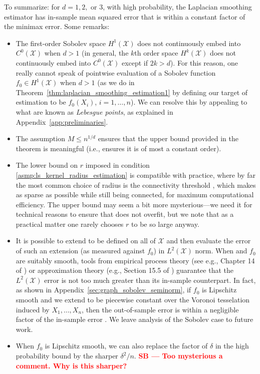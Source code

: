 \documentclass[twoside]{article}
\newcommand{\red}[1]{\textcolor{red}{#1}}
\newcommand{\sbcomment}[1]{{\bf{{\red{{SB --- #1}}}}}}
\newcommand{\1}{\mathbf{1}}
\newcommand{\Xset}{\mathcal{X}}
\newcommand{\Leb}{L}
\newcommand{\wh}[1]{\widehat{#1}}
\theoremstyle{definition}
\theoremstyle{remark}
\begin{document}
To summarize: for $d = 1,2,$ or $3$, with high probability, the Laplacian smoothing estimator \smash{$\wh{f}$} has in-sample mean squared error that is within a constant factor of the minimax error. Some remarks:
\begin{itemize}
	\item The first-order Sobolev space $H^1(\Xset)$ does not continuously embed into $C^0(\Xset)$ when $d>1$ (in general, the $k$th order space $H^k(\Xset)$ does not continuously embed into $C^0(\Xset)$ except if $2k>d$). For this reason, one really cannot speak of pointwise evaluation of a Sobolev function $f_0 \in H^1(\Xset)$ when $d>1$ (as we do in Theorem~\ref{thm:laplacian_smoothing_estimation1} by defining our target of estimation to be $f_0(X_i)$, $i=1,\ldots,n$). We can resolve this by appealing to what are known as \emph{Lebesgue points}, as explained in Appendix~\ref{app:preliminaries}.
	\item The assumption $M \leq n^{1/d}$ ensures that the upper bound provided in the theorem is meaningful (i.e., ensures it is of most a constant order).
	\item The lower bound on $r$ imposed in condition \ref{asmp:ls_kernel_radius_estimation} is compatible with practice, where by far the most common choice of radius is the connectivity threshold , which makes  as sparse as possible while still being connected, for maximum computational efficiency. The upper bound may seem a bit more mysterious---we need it for technical reasons to ensure that \smash{$\wh{f}$} does not overfit, but we note that as a practical matter one rarely chooses $r$ to be so large anyway.
	\item It is possible to extend \smash{$\wh{f}$} to be defined on all of $\Xset$ and then evaluate the error of such an extension (as measured against $f_0$) in $\Leb^2(\Xset)$ norm. When \smash{$\wh{f}$} and $f_0$ are suitably smooth, tools from empirical process theory (see e.g., Chapter 14 of \citet{wainwright2019}) or approximation theory (e.g., Section 15.5 of \citet{johnstone2011}) guarantee that the $\Leb^2(\Xset)$ error is not too much greater than its in-sample counterpart. In fact, as shown in Appendix~\ref{sec:graph_sobolev_seminorm}, if $f_0$ is Lipschitz smooth and we extend \smash{$\wh{f}$} to be piecewise constant over the Voronoi tesselation induced by $X_1,\ldots,X_n$, then the out-of-sample error \smash{$\|\wh{f}-f_0\|_{\Leb^2(\Xset)}$} is within a negligible factor of the in-sample error \smash{$\|\wh{f}-f_0\|_n$}. We leave analysis of the Sobolev case to future work.
	\item When $f_0$ is Lipschitz smooth, we can also replace the factor of $\delta$ in the high probability bound by the sharper $\delta^2/n$. \sbcomment{Too mysterious a comment. Why is this sharper?}
\end{itemize} 
\end{document}
